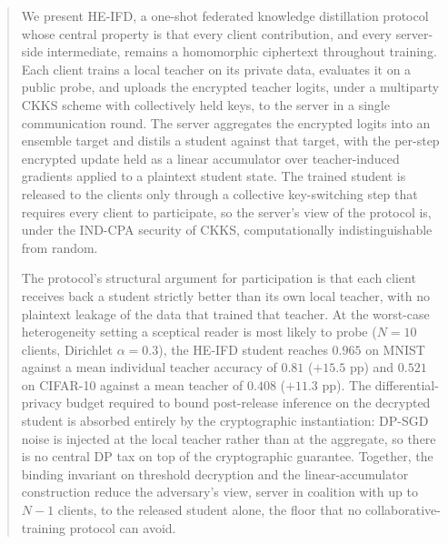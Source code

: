 \documentclass[lettersize,journal]{IEEEtran}
\begin{document}
\begin{abstract}


We present HE-IFD, a one-shot federated knowledge distillation protocol whose central property is that every client contribution, and every server-side intermediate, remains a homomorphic ciphertext throughout training. Each client trains a local teacher on its private data, evaluates it on a public probe, and uploads the encrypted teacher logits, under a multiparty CKKS scheme with collectively held keys, to the server in a single communication round. The server aggregates the encrypted logits into an ensemble target and distils a student against that target, with the per-step encrypted update held as a linear accumulator over teacher-induced gradients applied to a plaintext student state. The trained student is released to the clients only through a collective key-switching step that requires every client to participate, so the server's view of the protocol is, under the IND-CPA security of CKKS, computationally indistinguishable from random.

The protocol's structural argument for participation is that each client receives back a student strictly better than its own local teacher, with no plaintext leakage of the data that trained that teacher. At the worst-case heterogeneity setting a sceptical reader is most likely to probe ($N{=}10$ clients, Dirichlet $\alpha{=}0.3$), the HE-IFD student reaches $0.965$ on MNIST against a mean individual teacher accuracy of $0.81$ ($+15.5$ pp) and $0.521$ on CIFAR-10 against a mean teacher of $0.408$ ($+11.3$ pp). The differential-privacy budget required to bound post-release inference on the decrypted student is absorbed entirely by the cryptographic instantiation: DP-SGD noise is injected at the local teacher rather than at the aggregate, so there is no central DP tax on top of the cryptographic guarantee. Together, the binding invariant on threshold decryption and the linear-accumulator construction reduce the adversary's view, server in coalition with up to $N{-}1$ clients, to the released student alone, the floor that no collaborative-training protocol can avoid.


\end{abstract}
\end{document}
